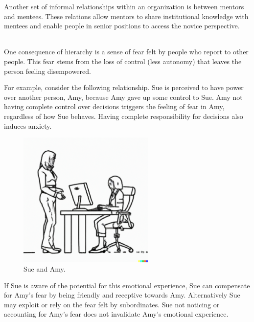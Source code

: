 Another set of informal relationships within an organization is between mentors and mentees. These relations allow mentors to share institutional knowledge with mentees and enable people in senior positions to access the novice perspective. 


\ \\

One consequence of hierarchy is a sense of fear felt by people who report to other people. This fear stems from the loss of control (less autonomy) that leaves the person feeling disempowered. 

For example, consider the following relationship. Sue is perceived to have power over another person, Amy, because Amy gave up some control to Sue. Amy not having complete control over decisions triggers the feeling of fear in Amy, regardless of how Sue behaves. Having complete responsibility for decisions also induces anxiety.

\begin{figure}[H]
    \centering
\includegraphics[width=0.6\textwidth]{images/female_supervisor_standing_while_talking_to_seated_female_employee_typing_on_keyboard.pdf}
    \caption{Sue and Amy.}
    \label{fig:subordinate_and_supervisor}
\end{figure}



If Sue is aware of the potential for this emotional experience, Sue can compensate for Amy's fear by being friendly and receptive towards Amy. Alternatively Sue may exploit or rely on the fear felt by subordinates. Sue not noticing or accounting for Amy's fear does not invalidate Amy's emotional experience.





